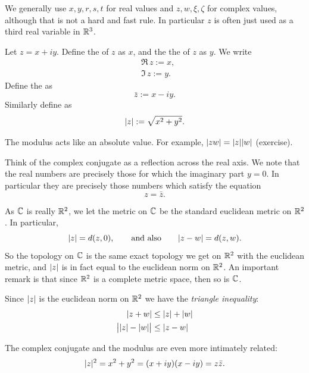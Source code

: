 We generally use $x,y,r,s,t$ for real values and $z,w,\xi,\zeta$
for complex values, although that is not a hard and fast rule.  In
particular $z$ is often just used as a third real variable in ${\mathbb{R}}^3$.

\begin{defn}
Let $z= x+iy$.
Define
the \emph{} of $z$ as $x$, and the
the \emph{} of $z$ as $y$.  We write
\begin{align*}
& \Re\, z := x , \\
& \Im\, z := y .
\end{align*}
Define the
\emph{} as
\begin{equation*}
\bar{z} := x-iy .
\end{equation*}
Similarly define \emph{} as
\begin{equation*}
\lvert {z} \rvert := \sqrt{x^2+y^2} .
\end{equation*}
\end{defn}
The modulus acts like an absolute value.  For example,
$\lvert {zw} \rvert = \lvert {z} \rvert \lvert {w} \rvert$ (exercise).

Think of the complex conjugate as a reflection across the real axis.
We note that the real numbers are precisely those for which the imaginary
part $y=0$.  In particular they are precisely those numbers which satisfy
the equation
\begin{equation*}
z = \bar{z} .
\end{equation*}

As ${\mathbb{C}}$ is really ${\mathbb{R}}^2$, we let the metric on ${\mathbb{C}}$ be the standard
euclidean metric on ${\mathbb{R}}^2$.
In particular,
\begin{equation*}
\lvert {z} \rvert = d(z,0) , \qquad 
\text{and also} \qquad 
\lvert {z-w} \rvert = d(z,w) .
\end{equation*}
So the topology on ${\mathbb{C}}$ is
the same exact topology we get on ${\mathbb{R}}^2$ with the euclidean metric,
and $\lvert {z} \rvert$ is in fact equal to the euclidean norm on ${\mathbb{R}}^2$.
An important remark is that since ${\mathbb{R}}^2$ is a complete metric space, then
so is ${\mathbb{C}}$.

Since $\lvert {z} \rvert$ is the euclidean norm on ${\mathbb{R}}^2$ we have the
\emph{triangle inequality}:
\begin{align*}
\lvert {z+w} \rvert & \leq \lvert {z} \rvert+\lvert {w} \rvert \\
\big\lvert \lvert {z} \rvert-\lvert {w} \rvert \big\rvert & \leq \lvert {z-w} \rvert
\end{align*}

The complex conjugate and the modulus are even more intimately related:
\begin{equation*}
\lvert {z} \rvert^2 =
x^2+y^2 =
(x+iy)(x-iy) =
z \bar{z} .
\end{equation*}

